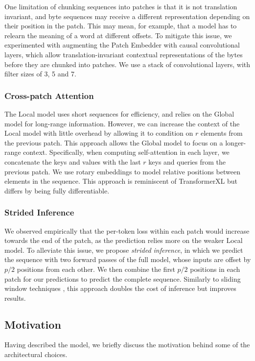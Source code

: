 \documentclass{article}
\theoremstyle{plain}
\theoremstyle{definition}
\theoremstyle{remark}
\begin{document}
One limitation of chunking sequences into patches is that it is not translation invariant, and byte sequences may receive a different representation depending on their position in the patch. This may mean, for example, that a model has to relearn the meaning of a word at different offsets. To mitigate this issue, we experimented with augmenting the Patch Embedder with causal convolutional layers, which allow translation-invariant contextual representations of the bytes before they are chunked into patches. We use a stack of convolutional layers, with filter sizes of 3, 5 and 7. 

\subsubsection{Cross-patch Attention}
The Local model uses short sequences for efficiency, and relies on the Global model for long-range information. However, we can increase the context of the Local model with little overhead by allowing it to condition on $r$ elements from the previous patch. This approach allows the Global model to focus on a longer-range context. Specifically, when computing self-attention in each layer, we concatenate the keys and values with the last $r$ keys and queries from the previous patch. We use rotary embeddings \citep{rotary} to model relative positions between elements in the sequence. This approach is reminiscent of TransformerXL \citep{xfmxl} but differs by being fully differentiable. 

\subsubsection{Strided Inference}
\label{strided}
We observed empirically that the per-token loss within each patch would increase towards the end of the patch, as the prediction relies more on the weaker Local model. To alleviate this issue, we propose \emph{strided inference}, in which we predict the sequence with two forward passes of the full model, whose inputs are offset by $p/2$ positions from each other. We then combine the first $p/2$ positions in each patch for our predictions to predict the complete sequence. Similarly to sliding window techniques \citep{shortformer}, this approach doubles the cost of inference but improves results.

\subsection{Motivation}
Having described the model, we briefly discuss the motivation behind some of the architectural choices.
\end{document}
